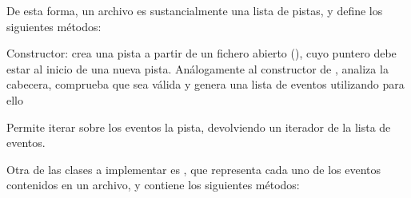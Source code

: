 De esta forma, un archivo es sustancialmente una lista de pistas, y define los siguientes métodos:

\begin{description}[style=nextline]
	\item[\code{\_\_init\_\_(self, file)}]
	Constructor: crea una pista a partir de un fichero abierto (), cuyo puntero debe estar al inicio de una nueva pista. Análogamente al constructor de , analiza la cabecera, comprueba que sea válida y genera una lista de eventos utilizando para ello 
	
	\item[\code{\_\_iter\_\_(self)}]
	Permite iterar sobre los eventos la pista, devolviendo un iterador de la lista de eventos.	
\end{description}

Otra de las clases a implementar es , que representa cada uno de los eventos contenidos en un archivo, y contiene los siguientes métodos:

